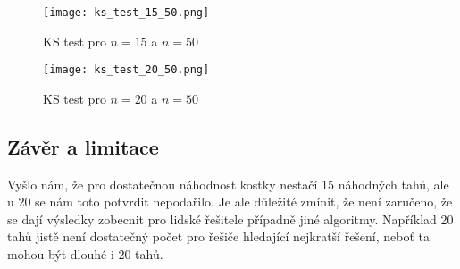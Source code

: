 \documentclass{article}
\begin{document}
\begin{figure}[h]
    \centering
    \begin{minipage}{0.49\textwidth}
        \centering
        \texttt{[image: ks\_test\_15\_50.png]}
        \caption{KS test pro $n = 15$ a $n = 50$}
        \label{fig:ks_test_15_50}
    \end{minipage}
    \hfill
    \begin{minipage}{0.49\textwidth}
        \centering
        \texttt{[image: ks\_test\_20\_50.png]}
        \caption{KS test pro $n = 20$ a $n = 50$}
        \label{fig:ks_test_20_50}
    \end{minipage}
\end{figure}

\subsection*{Závěr a limitace}
Vyšlo nám, že pro dostatečnou náhodnost kostky nestačí 15 náhodných tahů, ale u 20 se nám toto potvrdit nepodařilo.
Je ale důležité zmínit, že není zaručeno, že se dají výsledky zobecnit pro lidské řešitele případně jiné algoritmy.
Například 20 tahů jistě není dostatečný počet pro řešiče hledající nejkratší řešení,
neboť ta mohou být dlouhé i 20 tahů.
\end{document}
